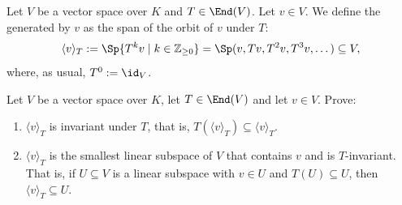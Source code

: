 \begin{definition}
  \label{def:T_cyclic_subspace}
  Let $V$ be a vector space over $K$ and $T \in \End(V)$. Let $v \in V$. We define the  generated by $v$ as the span of the orbit of $v$ under $T$:
  \[
  \langle v \rangle_T := \Sp\{T^k v \mid k \in \mathbb{Z}_{\ge 0}\} = \Sp(v, Tv, T^2v, T^3 v, \dots) \subseteq V,
  \]
  where, as usual, $T^0 := \id_V$.
\end{definition}

\begin{exercise}\label{ex:cyclic_minimal}
  Let $V$ be a vector space over $K$, let $T \in \End(V)$ and let $v \in V$. Prove:
  \begin{enumerate}[label=\textbf{(\alph*)}]
    \item $\langle v \rangle_T$ is invariant under $T$, that is, $T(\langle v \rangle_T) \subseteq \langle v \rangle_T$.
    \item $\langle v \rangle_T$ is the smallest linear subspace of $V$ that contains $v$ and is $T$-invariant. That is, if $U \subseteq V$ is a linear subspace with $v \in U$ and $T(U) \subseteq U$, then $\langle v \rangle_T \subseteq U$.
  \end{enumerate}
\end{exercise}

